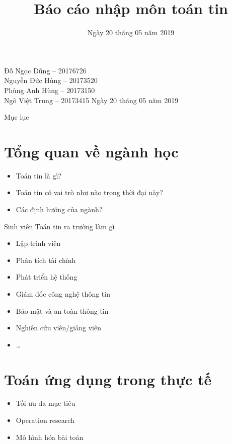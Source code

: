 \documentclass[aspectratio=43]{beamer}
\title{Báo cáo nhập môn toán tin}
\date{Ngày 20 tháng 05 năm 2019}
\author{
}
\begin{document}
\begin{frame}
	\begin{center}
		\vfill
		{\Huge \color{primary}{Báo cáo nhập môn toán tin}}\par
		\vfill
		Đỗ Ngọc Dũng -- 20176726\\
		Nguyễn Đức Hùng -- 20173520\\
		Phùng Anh Hùng -- 20173150\\
		Ngô Việt Trung -- 20173415
		\vfill
		Ngày 20 tháng 05 năm 2019
	\end{center}
\end{frame}

\begin{frame}{Mục lục}
\tableofcontents	
\end{frame}

\section{Tổng quan về ngành học}
\begin{frame}{\secname}	
	\begin{itemize}
		\item Toán tin là gì?
		\item Toán tin có vai trò như nào trong thời đại này?
		\item Các định hướng của ngành?
	\end{itemize}
\end{frame}

\begin{frame}{Sinh viên Toán tin ra trường làm gì}
	\begin{itemize}
		\item Lập trình viên
		\item Phân tích tài chính
		\item Phát triển hệ thống
		\item Giám đốc công nghệ thông tin 
		\item Bảo mật và an toàn thông tin
		\item Nghiên cứu viên/giảng viên
		\item \ldots
	\end{itemize}
\end{frame}

\section{Toán ứng dụng trong thực tế}
\begin{frame}{\secname}
	\begin{itemize}
		\item Tối ưu đa mục tiêu
		\item Operation research
		\item Mô hình hóa bài toán
	\end{itemize}	
\end{frame}
\end{document}
